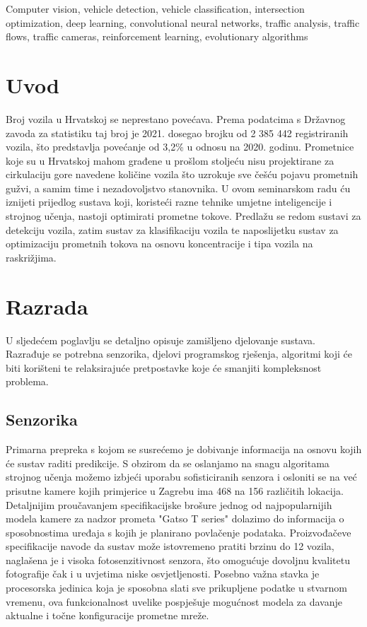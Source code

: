 \documentclass[seminarski, times, utf8]{fer}
\begin{document}
\begin{keywords}
Computer vision, vehicle detection, vehicle classification, intersection optimization, deep learning, convolutional neural networks, traffic analysis, traffic flows, traffic cameras, reinforcement learning, evolutionary algorithms
\end{keywords}


\tableofcontents


\chapter{Uvod}
\label{pog:uvod}
Broj vozila u Hrvatskoj se neprestano povećava. Prema podatcima s Državnog zavoda za statistiku taj broj je 2021. dosegao brojku od 2 385 442 registriranih vozila, što predstavlja povećanje od 3,2\% u odnosu na 2020. godinu. \citep{dzs_website}
Prometnice koje su u Hrvatskoj mahom građene u prošlom stoljeću nisu projektirane za cirkulaciju gore navedene količine vozila što uzrokuje sve češću pojavu prometnih gužvi, a samim time i nezadovoljstvo stanovnika. U ovom seminarskom radu ću iznijeti prijedlog sustava koji, koristeći razne tehnike umjetne inteligencije i strojnog učenja, nastoji optimirati prometne tokove. Predlažu se redom sustavi za detekciju vozila, zatim sustav za klasifikaciju vozila te naposlijetku sustav za optimizaciju prometnih tokova na osnovu koncentracije i tipa vozila na raskrižjima.  


\chapter{Razrada}
\label{pog:razrada}
U sljedećem poglavlju se detaljno opisuje zamišljeno djelovanje sustava. Razrađuje se potrebna senzorika, djelovi programskog rješenja, algoritmi koji će biti korišteni te relaksirajuće pretpostavke koje će smanjiti kompleksnost problema.
\section{Senzorika}
Primarna prepreka s kojom se susrećemo je dobivanje informacija na osnovu kojih će sustav raditi predikcije. S obzirom da se oslanjamo na snagu algoritama strojnog učenja možemo izbjeći uporabu sofisticiranih senzora i osloniti se na već prisutne kamere kojih primjerice u Zagrebu ima 468 na 156 različitih lokacija.
Detaljnijim proučavanjem specifikacijske brošure jednog od najpopularnijih modela kamere za nadzor prometa "Gatso T series" dolazimo do informacija o sposobnostima uređaja  s kojih je planirano povlačenje podataka. Proizvođačeve specifikacije navode da sustav može istovremeno pratiti brzinu do 12 vozila, naglašena je i visoka fotosenzitivnost senzora, što omogućuje dovoljnu kvalitetu fotografije čak i u uvjetima niske osvjetljenosti.\citep{gatso} Posebno važna stavka je procesorska jedinica koja je sposobna slati sve prikupljene podatke u stvarnom vremenu, ova funkcionalnost uvelike pospješuje mogućnost modela za davanje aktualne i točne konfiguracije prometne mreže.
\end{document}
